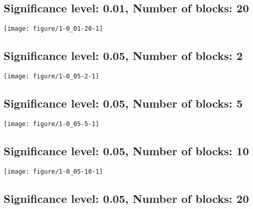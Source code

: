 \documentclass[11pt,letter]{article}\usepackage[]{graphicx}\usepackage[]{color}
\makeatletter
\def\maxwidth{ %
  \ifdim\Gin@nat@width>\linewidth
    \linewidth
  \else
    \Gin@nat@width
  \fi
}
\newenvironment{knitrout}{}{} %
\makeatother
\begin{document}
\newpage
\subsection{Significance level: 0.01, Number of blocks: 20}

\begin{knitrout}
\color{fgcolor}
\texttt{[image: figure/1-0\_01-20-1]} 

\end{knitrout}

\newpage
\subsection{Significance level: 0.05, Number of blocks: 2}

\begin{knitrout}
\color{fgcolor}
\texttt{[image: figure/1-0\_05-2-1]} 

\end{knitrout}

\newpage
\subsection{Significance level: 0.05, Number of blocks: 5}

\begin{knitrout}
\color{fgcolor}
\texttt{[image: figure/1-0\_05-5-1]} 

\end{knitrout}

\newpage
\subsection{Significance level: 0.05, Number of blocks: 10}

\begin{knitrout}
\color{fgcolor}
\texttt{[image: figure/1-0\_05-10-1]} 

\end{knitrout}

\newpage
\subsection{Significance level: 0.05, Number of blocks: 20}
\end{document}
